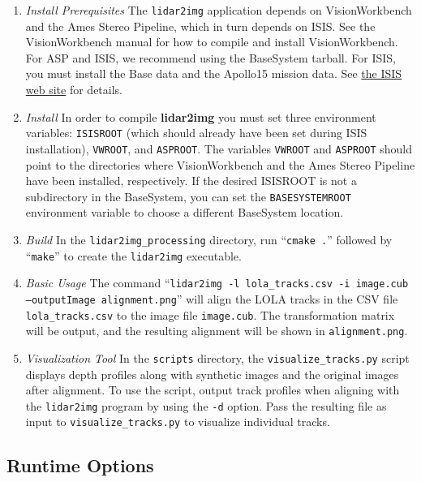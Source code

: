 \begin{enumerate}
	\item{\emph{Install Prerequisites}} The {\texttt{lidar2img}} application depends on VisionWorkbench and the
		Ames Stereo Pipeline, which in turn depends on ISIS. See the VisionWorkbench manual
		for how to compile and install VisionWorkbench. For ASP and ISIS, we recommend using
		the BaseSystem tarball. %
		For ISIS, you must install the Base data and the Apollo15 mission data. See
		\href{http://isis.astrogeology.usgs.gov/}{the ISIS web site} for details.
	\item{\emph{Install }}
		In order to compile {\bf{lidar2img}} you must set three environment variables:
		{\texttt{ISISROOT}} (which should already have been set during ISIS installation),
		{\texttt{VWROOT}}, and {\texttt{ASPROOT}}. The variables {\texttt{VWROOT}} and
		{\texttt{ASPROOT}} should point to the directories where VisionWorkbench and the
		Ames Stereo Pipeline have been installed, respectively. If the desired ISISROOT
		is not a subdirectory in the BaseSystem, you can set the {\texttt{BASESYSTEMROOT}}
		environment variable to choose a different BaseSystem location.
	\item{\emph{Build }}
		In the \texttt{lidar2img\_processing} directory, run ``\texttt{cmake .}'' followed by
		``\texttt{make}'' to create the {\texttt{lidar2img}} executable.
	\item{\emph{Basic Usage}}
		The command ``\texttt{lidar2img -l lola\_tracks.csv -i image.cub --outputImage alignment.png}'' will
		align the LOLA tracks in the CSV file \texttt{lola\_tracks.csv} to the image file \texttt{image.cub}.
		The transformation matrix will be output, and the resulting alignment will be shown in \texttt{alignment.png}.
	\item{\emph{Visualization Tool}}
		In the \texttt{scripts} directory, the \texttt{visualize\_tracks.py} script displays depth profiles along
		with synthetic images and the original images after alignment. To use the script, output track profiles when
		aligning with the \texttt{lidar2img} program by using the \texttt{-d} option. Pass the resulting file as
		input to \texttt{visualize\_tracks.py} to visualize individual tracks.

\end{enumerate}

\subsection{Runtime Options}


